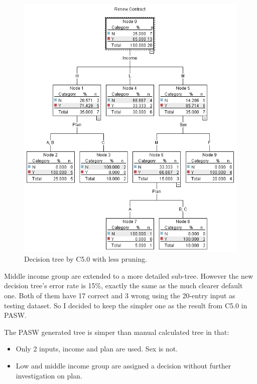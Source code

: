 \documentclass[12pt]{article}
\begin{document}
\begin{figure}[!ht]
\begin{center}
\includegraphics[width=\textwidth]{fig/new_tree.png}
\caption{Decision tree by C5.0 with less pruning.}
\label{fig:new_tree}
\end{center}
\end{figure}

Middle income group are extended to a more detailed sub-tree. However the new decision tree's error rate is 15\%, exactly the same as the much clearer default one. Both of them have 17 correct and 3 wrong using the 20-entry input as testing dataset. So I decided to keep the simpler one as the result from C5.0 in PASW.

The PASW generated tree is simper than manual calculated tree in that:
\begin{itemize}
\item Only 2 inputs, income and plan are used. Sex is not.
\item Low and middle income group are assigned a decision without further investigation on plan.
\end{itemize}
\end{document}
